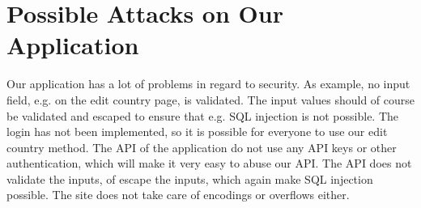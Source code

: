 \section{Possible Attacks on Our Application}
Our application has a lot of problems in regard to security.
As example, no input field, e.g. on the edit country page, is validated. The input values should of course be validated and escaped to ensure that e.g. SQL injection is not possible.
The login has not been implemented, so it is possible for everyone to use our edit country method. The API of the application do not use any API keys or other authentication, which will make it very easy to abuse our API. The API does not validate the inputs, of escape the inputs, which again make SQL injection possible.
The site does not take care of encodings or overflows either.